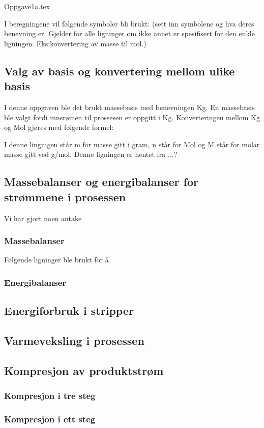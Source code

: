 {Oppgave1a.tex}


I beregningene vil følgende symboler bli brukt: (sett inn symbolene og hva deres benevning er. Gjelder for alle ligninger om ikke annet er spesifisert for den enkle ligningen. Eks:konvertering av masse til mol.)

\subsection{Valg av basis og konvertering mellom ulike basis}

I denne oppgaven ble det brukt massebasis med benevningen Kg. En massebasis ble valgt fordi innsrømen til prossesen er oppgitt i Kg. Konverteringen mellom Kg og Mol gjøres med følgende formel:

I denne lingnigen står m for masse gitt i gram, n står for Mol og M står for molar masse gitt ved g/mol. Denne ligningen er hentet fra ...?


\subsection{Massebalanser og energibalanser for strømmene i prosessen}
Vi har gjort noen antake


\subsubsection{Massebalanser}

Følgende ligninger ble brukt for å 

\subsubsection{Energibalanser}

\subsection{Energiforbruk i stripper}

\subsection{Varmeveksling i prosessen}

\subsection{Kompresjon av produktstrøm}

\subsubsection{Kompresjon i tre steg}

\subsubsection{Kompresjon i ett steg}

